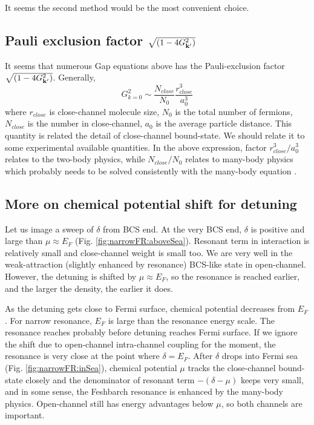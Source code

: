 \documentclass{article}
\begin{document}
It seems the second method would be the most convenient choice.  
\subsection{Pauli exclusion factor  $\sqrt{(1-4G_{\mathbf{k}'}^{2})}$ }
It seems that numerous Gap equations above has the Pauli-exclusion factor $\sqrt{(1-4G_{\mathbf{k}'}^{2})}$.  Generally, 
\begin{equation}
G_{k=0}^{2}\sim{\frac{N_{close}}{N_{0}}\frac{r_{close}^{3}}{a_{0}^{3}}}
\end{equation}
where $r_{close}$ is close-channel molecule size, $N_{0}$ is the total number of fermions, $N_{close}$ is the number in close-channel, $a_{0}$ is the average particle distance.  This quantity is related the detail of close-channel bound-state.  We should relate it to some experimental available quantities.  In the above expression, factor $r_{close}^{3}/a_{0}^{3}$ relates to the two-body physics, while $N_{close}/N_{0}$ relates to many-body physics which probably needs to be solved consistently with the many-body equation .  

\subsection{More on chemical potential shift for detuning}
Let us image a sweep of $\delta$ from BCS end.  At the very BCS end, $\delta$ is positive and large than $\mu\approx{}E_{F}$ (Fig. \ref{fig:narrowFR:aboveSea}). Resonant term in interaction is relatively small and close-channel weight is small too.  We are very well in the  weak-attraction (slightly enhanced by resonance) BCS-like state in open-channel.  However, the detuning is shifted by $\mu\approx{}E_{F}$, so the resonance is reached earlier, and the larger the density, the earlier it does.  

As the detuning gets close to Fermi surface, chemical potential decreases from $E_{F}$. For narrow resonance, $E_{F}$ is large than the resonance energy scale.  The resonance reaches probably before detuning reaches Fermi surface.  If we ignore the shift due to open-channel intra-channel coupling for the moment, the resonance is very close at the point where $\delta=E_{F}$.  After $\delta$ drops into Fermi sea (Fig. \ref{fig:narrowFR:inSea}), chemical potential $\mu$ tracks the close-channel bound-state closely and the denominator of resonant term $-(\delta-\mu)$ keeps very small, and in some sense, the Feshbarch resonance is enhanced by the many-body  physics.  Open-channel still has energy advantages below $\mu$, so both channels are important.  
\end{document}
